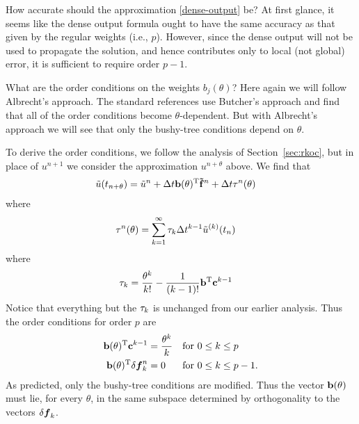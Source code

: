 \documentclass[12pt]{article}
\begin{document}
How accurate should the approximation \eqref{dense-output} be?
At first glance, it seems like the dense output formula ought
to have the same accuracy as that given by the regular weights (i.e., $p$).
However, since the dense output will not be used to propagate the solution,
and hence contributes only to local (not global) error, it is sufficient
to require order $p-1$.

What are the order conditions on the weights $b_j(\theta)$?  Here again
we will follow Albrecht's approach.  The standard references use Butcher's
approach and find that all of the order conditions become $\theta$-dependent.
But with Albrecht's approach we will see that only the bushy-tree conditions
depend on $\theta$.

To derive the order conditions, we follow the analysis of Section~\ref{sec:rkoc},
but in place of $u^{n+1}$ we consider the approximation $u^{n+\theta}$ above.
We find that 
\begin{align*}
\tilde{u}(t_{n+\theta}) & = \tilde{u}^{n} + \Delta t \mathbf{b}(\theta)^\mathrm{T}\mathbf{\tilde{f}}^n + \Delta t \tau^n(\theta)
\end{align*}
where
\begin{align*}
\tau^n(\theta) & = \sum_{k=1}^\infty \tau_k \Delta t^{k-1} \tilde{u}^{(k)}(t_{n})
\end{align*}
where
\begin{align*}
\tau_k & = \frac{\theta^k}{k!} - \frac{1}{(k-1)!} \mathbf{b}^\mathrm{T} \mathbf{c}^{k-1}
\end{align*}
Notice that everything but the $\tau_k$ is unchanged from our earlier
analysis.  Thus the order conditions for order $p$ are
\begin{align*}    
\mathbf{b}(\theta)^\mathrm{T} \mathbf{c}^{k-1} & = \frac{\theta^k}{k}  &  \mbox{for }  & 0\le k\le p \\
\mathbf{b}(\theta)^\mathrm{T}\delta\boldsymbol{f}^n_k & = 0 &  \mbox{for } & 0\le k\le p-1.
\end{align*}
As predicted, only the bushy-tree conditions are modified.
Thus the vector $\mathbf{b}(\theta)$ must lie, for every $\theta$, in the same
subspace determined by orthogonality to the vectors $\delta\boldsymbol{f}_k$.



\end{document}
